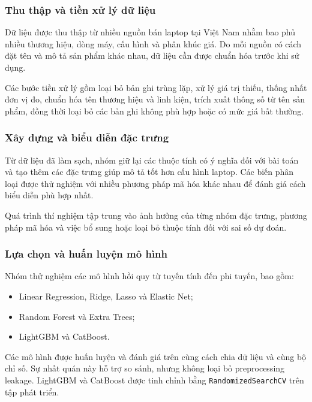 \subsubsection{Thu thập và tiền xử lý dữ liệu}

Dữ liệu được thu thập từ nhiều nguồn bán laptop tại Việt Nam nhằm bao phủ nhiều thương hiệu, dòng máy, cấu hình và phân khúc giá. Do mỗi nguồn có cách đặt tên và mô tả sản phẩm khác nhau, dữ liệu cần được chuẩn hóa trước khi sử dụng.

Các bước tiền xử lý gồm loại bỏ bản ghi trùng lặp, xử lý giá trị thiếu, thống nhất đơn vị đo, chuẩn hóa tên thương hiệu và linh kiện, trích xuất thông số từ tên sản phẩm, đồng thời loại bỏ các bản ghi không phù hợp hoặc có mức giá bất thường.

\subsubsection{Xây dựng và biểu diễn đặc trưng}

Từ dữ liệu đã làm sạch, nhóm giữ lại các thuộc tính có ý nghĩa đối với bài toán và tạo thêm các đặc trưng giúp mô tả tốt hơn cấu hình laptop. Các biến phân loại được thử nghiệm với nhiều phương pháp mã hóa khác nhau để đánh giá cách biểu diễn phù hợp nhất.

Quá trình thí nghiệm tập trung vào ảnh hưởng của từng nhóm đặc trưng, phương pháp mã hóa và việc bổ sung hoặc loại bỏ thuộc tính đối với sai số dự đoán.

\subsubsection{Lựa chọn và huấn luyện mô hình}

Nhóm thử nghiệm các mô hình hồi quy từ tuyến tính đến phi tuyến, bao gồm:

\begin{itemize}
    \item Linear Regression, Ridge, Lasso và Elastic Net;
    \item Random Forest và Extra Trees;
    \item LightGBM và CatBoost.
\end{itemize}

Các mô hình được huấn luyện và đánh giá trên cùng cách chia dữ liệu và cùng bộ chỉ số. Sự nhất quán này hỗ trợ so sánh, nhưng không loại bỏ preprocessing leakage. LightGBM và CatBoost được tinh chỉnh bằng \texttt{RandomizedSearchCV} trên tập phát triển.

